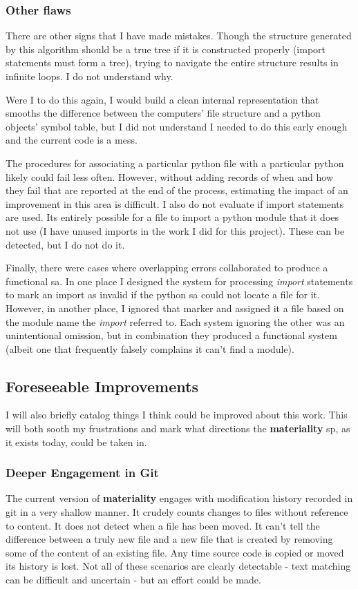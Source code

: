 \documentclass[a4paper,man,natbib,floatsintext]{apa6}
\begin{document}
  \subsubsection{Other flaws}
  There are other signs that I have made mistakes. Though the structure generated by this algorithm should be a true tree if it is constructed properly (import statements must form a tree), trying to navigate the entire structure results in infinite loops. I do not understand why. 

  Were I to do this again, I would build a clean internal representation that smooths the difference between the computers' file structure and a python objects' symbol table, but I did not understand I needed to do this early enough and the current code is a mess. 

  The procedures for associating a particular \Gls{python} file with a particular \Gls{python} likely could fail less often. However, without adding records of when and how they fail that are reported at the end of the process, estimating the impact of an improvement in this area is difficult. I also do not evaluate if import statements are used. Its entirely possible for a file to import a \Gls{python} module that it does not use (I have unused imports in the work I did for this project). These can be detected, but I do not do it.

  Finally, there were cases where overlapping errors collaborated to produce a functional \gls{sa}. In one place I designed the system for processing \textit{import} statements to mark an import as invalid if the \Gls{python} \gls{sa} could not locate a file for it. However, in another place, I ignored that marker and assigned it a file based on the module name the \textit{import} referred to. Each system ignoring the other was an unintentional omission, but in combination they produced a functional system (albeit one that frequently falsely complains it can't find a module).

  \subsection{Foreseeable Improvements}
  I will also briefly catalog things I think could be improved about this work. This will both sooth my frustrations and mark what directions the \textbf{materiality} \gls{sp}, as it exists today, could be taken in.

  \subsubsection{Deeper Engagement in Git}
  The current version of \textbf{materiality} engages with modification history recorded in git in a very shallow manner. It crudely counts changes to files without reference to content. It does not detect when a file has been moved. It can't tell the difference between a truly new file and a new file that is created by removing some of the content of an existing file. Any time source code is copied or moved its history is lost. Not all of these scenarios are clearly detectable - text matching can be difficult and uncertain - but an effort could be made.
\end{document}
